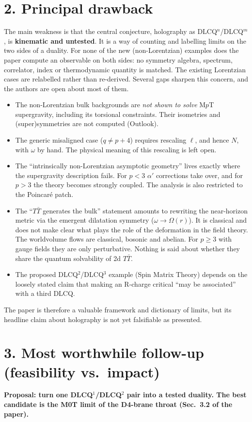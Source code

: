 \documentclass[11pt,a4paper]{article}
\begin{document}
\section*{2. Principal drawback}
The main weakness is that the central conjecture, holography as DLCQ$^n$/DLCQ$^m$, is
\textbf{kinematic and untested}. It is a way of counting and labelling limits on the two
sides of a duality. For none of the new (non-Lorentzian) examples does the paper compute an
observable on both sides: no symmetry algebra, spectrum, correlator, index or thermodynamic
quantity is matched. The existing Lorentzian cases are relabelled rather than re-derived. Several
gaps sharpen this concern, and the authors are open about most of them.
\begin{itemize}
\item The non-Lorentzian bulk backgrounds are \emph{not shown to solve} M$p$T supergravity,
including its torsional constraints. Their isometries and (super)symmetries are not computed
(Outlook).
\item The generic misaligned case ($q\neq p+4$) requires rescaling $\ell$, and hence $N$,
with $\omega$ by hand. The physical meaning of this rescaling is left open.
\item The ``intrinsically non-Lorentzian asymptotic geometry'' lives exactly where the
supergravity description fails. For $p<3$ $\alpha'$ corrections take over, and for $p>3$ the
theory becomes strongly coupled. The analysis is also restricted to the Poincar\'e patch.
\item The ``$T\bar T$ generates the bulk'' statement amounts to rewriting the near-horizon metric
via the emergent dilatation symmetry ($\omega\to\mathbb{\Omega}(r)$). It is classical and does
not make clear what plays the role of the deformation in the field theory. The worldvolume flows
are classical, bosonic and abelian. For $p\ge3$ with gauge fields they are only perturbative.
Nothing is said about whether they share the quantum solvability of 2d $T\bar T$.
\item The proposed DLCQ$^2$/DLCQ$^3$ example (Spin Matrix Theory) depends on the
loosely stated claim that making an R-charge critical ``may be associated'' with a third DLCQ.
\end{itemize}
The paper is therefore a valuable framework and dictionary of limits, but its headline claim
about holography is not yet falsifiable as presented.

\section*{3. Most worthwhile follow-up (feasibility vs.\ impact)}
\textbf{Proposal: turn one DLCQ$^1$/DLCQ$^2$ pair into a tested duality. The best candidate is
the M0T limit of the D4-brane throat (Sec.~3.2 of the paper).}
\end{document}
